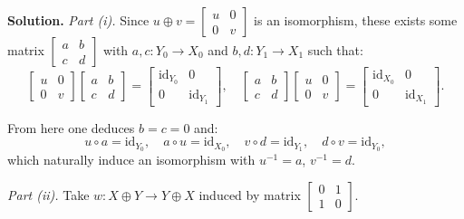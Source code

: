 \documentclass{category-template}
\begin{document}
\textbf{Solution.} \textit{Part (i).} Since $u \oplus v = \begin{bmatrix}
    u & 0 \\ 0 & v
\end{bmatrix}$ is an isomorphism, these exists some matrix $\begin{bmatrix}
    a & b \\ c & d
\end{bmatrix}$ with $a,c: Y_0 \to X_0$ and $b,d: Y_1 \to X_1$ such that:
\begin{equation*}
    \begin{bmatrix}
    u & 0 \\ 0 & v
\end{bmatrix}\begin{bmatrix}
    a & b \\ c & d
\end{bmatrix} = \begin{bmatrix}
    \text{id}_{Y_0} & 0 \\
    0 & \text{id}_{Y_1}
\end{bmatrix}, \quad \begin{bmatrix}
    a & b \\ c & d
\end{bmatrix}\begin{bmatrix}
    u & 0 \\ 0 & v
\end{bmatrix} = \begin{bmatrix}
    \text{id}_{X_0} & 0 \\
    0 & \text{id}_{X_1}
\end{bmatrix}.
\end{equation*}

From here one deduces $b=c=0$ and:
\begin{equation*}
    u \circ a = \text{id}_{Y_0}, \quad a \circ u = \text{id}_{X_0}, \quad 
    v \circ d = \text{id}_{Y_1}, \quad d \circ v = \text{id}_{Y_0},
\end{equation*}
which naturally induce an isomorphism with $u^{-1}=a$, $v^{-1}=d$.

\textit{Part (ii).} Take $w: X \oplus Y \to Y \oplus X$ induced 
by matrix $\begin{bmatrix}
    0 & 1 \\
    1 & 0 \end{bmatrix}$.
\end{document}
